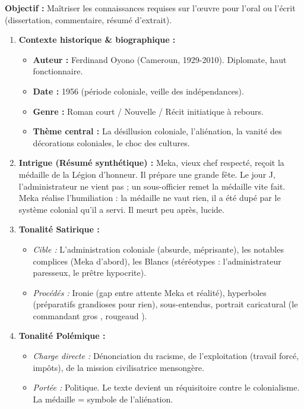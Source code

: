 \documentclass[11pt]{article}
\newcommand{\cle}[1]{{\popxbold\color{popdark}#1}}
\begin{document}
\begin{methode}
\textbf{Objectif :} Maîtriser les connaissances requises sur l'œuvre pour l'oral ou l'écrit (dissertation, commentaire, résumé d'extrait).
\begin{enumerate}
    \item \textbf{Contexte historique \& biographique :} 
    \begin{itemize}
        \item \textbf{Auteur :} Ferdinand \cle{Oyono} (Cameroun, 1929-2010). Diplomate, haut fonctionnaire.
        \item \textbf{Date :} 1956 (période coloniale, veille des indépendances).
        \item \textbf{Genre :} Roman court / Nouvelle / Récit initiatique à rebours.
        \item \textbf{Thème central :} La désillusion coloniale, l'aliénation, la vanité des décorations coloniales, le choc des cultures.
    \end{itemize}
    \item \textbf{Intrigue (Résumé synthétique) :} Meka, vieux chef respecté, reçoit la médaille de la \cle{Légion d'honneur}. Il prépare une grande fête. Le jour J, l'administrateur ne vient pas ; un sous-officier remet la médaille vite fait. Meka réalise l'humiliation : la médaille ne vaut rien, il a été dupé par le système colonial qu'il a servi. Il meurt peu après, lucide.
    \item \textbf{Tonalité \cle{Satirique} :} 
    \begin{itemize}
        \item \emph{Cible :} L'administration coloniale (absurde, méprisante), les notables complices (Meka d'abord), les Blancs (stéréotypes : l'administrateur paresseux, le prêtre hypocrite).
        \item \emph{Procédés :} Ironie (gap entre attente Meka et réalité), hyperboles (préparatifs grandioses pour rien), sous-entendus, portrait caricatural (le commandant \og gros \fg{}, \og rougeaud \fg{}).
    \end{itemize}
    \item \textbf{Tonalité \cle{Polémique} :} 
    \begin{itemize}
        \item \emph{Charge directe :} Dénonciation du racisme, de l'exploitation (travail forcé, impôts), de la \og mission civilisatrice \fg{} mensongère.
        \item \emph{Portée :} Politique. Le texte devient un réquisitoire contre le colonialisme. La médaille = symbole de l'aliénation.

\end{itemize}
\end{enumerate}
\end{methode}
\end{document}
